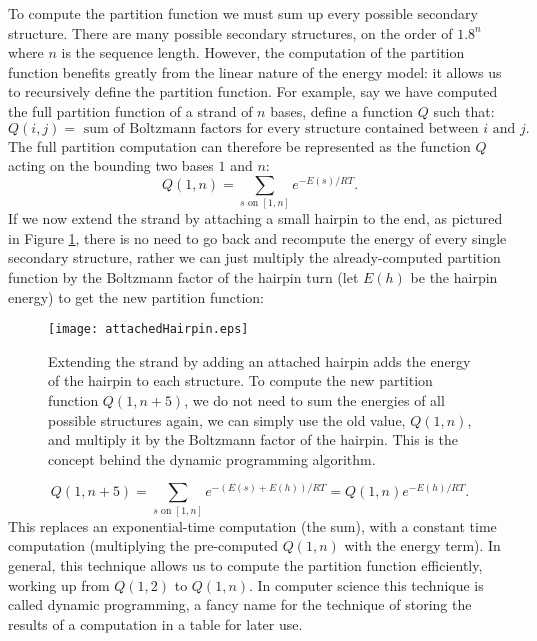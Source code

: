 To compute the partition function we must sum up every possible
secondary structure. There are many possible secondary structures, on
the order of $1.8^n$ where $n$ is the sequence length. However, the
computation of the partition function benefits greatly from the linear
nature of the energy model: it allows us to recursively define the
partition function. For example, say we have computed the full
partition function of a strand of $n$ bases, define a function $Q$
such that:
\begin{equation}
Q(i, j) = \text { sum of Boltzmann factors for every structure contained between } i \text{ and } j.
\end{equation}
The full partition computation can therefore be represented as the
function $Q$ acting on the bounding two bases $1$ and $n$: 
\begin{equation}
 Q(1, n) = \sum_{s \text{ on } [1,n]} e^{-E(s)/RT}.
\end{equation}
If we now extend the strand by attaching a small hairpin to the end,
as pictured in Figure \ref{fig:attachedHairpin}, there is no need to
go back and recompute the energy of every single secondary structure,
rather we can just multiply the already-computed partition function by
the Boltzmann factor of the hairpin turn (let $E(h)$ be the hairpin
energy) to get the new partition function:
\begin{figure}[h]
\texttt{[image: attachedHairpin.eps]}
\caption{Extending the strand by adding an attached hairpin adds the
  energy of the hairpin to each structure. To compute the new
  partition function $Q(1, n+5)$, we do not need to sum the energies
  of all possible structures again, we can simply use the old value,
  $Q(1,n)$, and multiply it by the Boltzmann factor of the
  hairpin. This is the concept behind the dynamic programming
  algorithm.}
\label{fig:attachedHairpin}
\end{figure}
\begin{equation}
Q(1, n + 5) = \sum_{s \text{ on } [1,n]} e^{-(E(s) + E(h))/RT} = Q(1, n)e^{-E(h)/RT}. 
\end{equation}
This replaces an exponential-time computation (the sum), with a
constant time computation (multiplying the pre-computed $Q(1, n)$ with
the energy term). In general, this technique allows us to compute the
partition function efficiently, working up from $Q(1, 2)$ to
$Q(1,n)$. In computer science this technique is called dynamic
programming, a fancy name for the technique of storing the
results of a computation in a table for later use.

